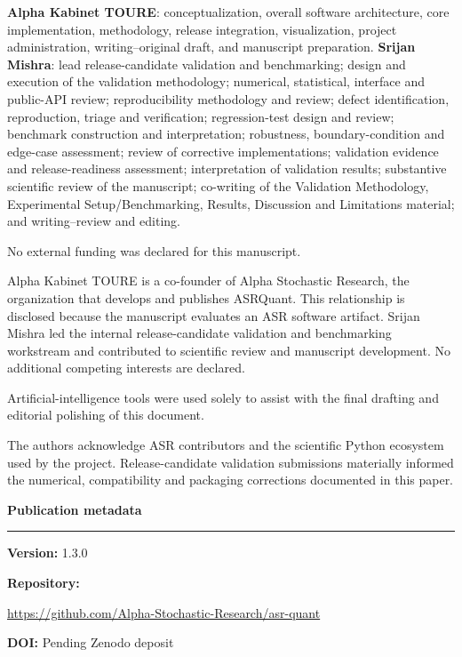 \documentclass{asrpaper}
\renewcommand{\ASRMetadataBlock}{%
  \par\vspace{7pt}\noindent
  \begin{minipage}{\columnwidth}
  {\normalsize\bfseries\color{ASRBlack}Publication metadata}\par\vspace{2pt}
  {\color{ASRRule}\rule{\linewidth}{0.4pt}}\par\vspace{3pt}
  {\small\raggedright
  \textbf{Version:} 1.3.0\par
  \textbf{Repository:}\par
  {\footnotesize\url{https://github.com/Alpha-Stochastic-Research/asr-quant}}\par
  \textbf{DOI:} Pending Zenodo deposit\par
  }
  \end{minipage}\par\vspace{4pt}%
}
\begin{document}
{\small \textbf{Alpha Kabinet TOURE}: conceptualization, overall software architecture, core implementation, methodology, release integration, visualization, project administration, writing--original draft, and manuscript preparation. \textbf{Srijan Mishra}: lead release-candidate validation and benchmarking; design and execution of the validation methodology; numerical, statistical, interface and public-API review; reproducibility methodology and review; defect identification, reproduction, triage and verification; regression-test design and review; benchmark construction and interpretation; robustness, boundary-condition and edge-case assessment; review of corrective implementations; validation evidence and release-readiness assessment; interpretation of validation results; substantive scientific review of the manuscript; co-writing of the Validation Methodology, Experimental Setup/Benchmarking, Results, Discussion and Limitations material; and writing--review and editing.}

{\small No external funding was declared for this manuscript.}

{\small Alpha Kabinet TOURE is a co-founder of Alpha Stochastic Research, the organization that develops and publishes ASRQuant. This relationship is disclosed because the manuscript evaluates an ASR software artifact. Srijan Mishra led the internal release-candidate validation and benchmarking workstream and contributed to scientific review and manuscript development. No additional competing interests are declared.}

{\small Artificial-intelligence tools were used solely to assist with the final drafting and editorial polishing of this document.}

{\small The authors acknowledge ASR contributors and the scientific Python ecosystem used by the project. Release-candidate validation submissions materially informed the numerical, compatibility and packaging corrections documented in this paper.}

\ASRMetadataBlock
\end{document}
